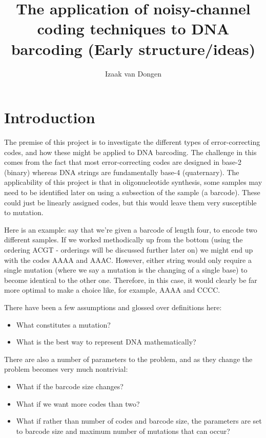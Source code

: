 \documentclass{article}
\title{The application of noisy-channel coding techniques to DNA barcoding (Early structure/ideas)}
\author{Izaak van Dongen}
\begin{document}
    \maketitle
    \tableofcontents
    \lstlistoflistings

    \section{Introduction}
    The premise of this project is to investigate the different types of
    error-correcting codes, and how these might be applied to DNA barcoding.
    The challenge in this comes from the fact that most error-correcting codes
    are designed in base-2 (binary) whereas DNA strings are fundamentally
    base-4 (quaternary). The applicability of this project is that in
    oligonucleotide synthesis, some samples may need to be identified later on
    using a subsection of the sample (a barcode). These could just be linearly
    assigned codes, but this would leave them very susceptible to mutation.

    Here is an example: say that we're given a barcode of length four, to
    encode two different samples. If we worked methodically up from the bottom
    (using the ordering ACGT - orderings will be discussed further later on) we
    might end up with the codes AAAA and AAAC. However, either string would
    only require a single mutation (where we say a mutation is the changing of
    a single base) to become identical to the other one. Therefore, in this
    case, it would clearly be far more optimal to make a choice like, for
    example, AAAA and CCCC.

    There have been a few assumptions and glossed over definitions here:

    \begin{itemize}
        \item What constitutes a mutation?
        \item What is the best way to represent DNA mathematically?
    \end{itemize}

    There are also a number of parameters to the problem, and as they change
    the problem becomes very much nontrivial:

    \begin{itemize}
    \item What if the barcode size changes?
    \item What if we want more codes than two?
    \item What if rather than number of codes and barcode size, the parameters
          are set to barcode size and maximum number of mutations that can
          occur?
    \end{itemize}
    
\end{document}
